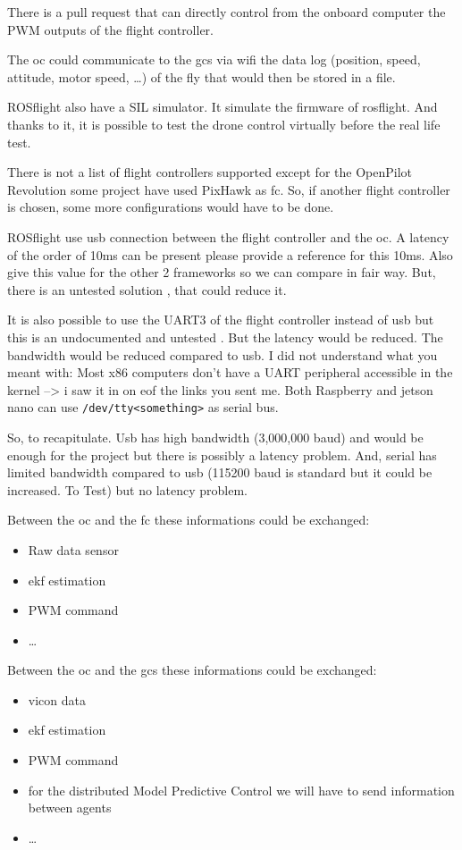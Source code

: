 There is a pull request \cite{github_rosflight_98} that can directly control from the onboard computer the PWM outputs of the flight controller.

The \gls{oc} could communicate to the \gls{gcs} via wifi the data log (position, speed, attitude, motor speed, …) of the fly that would then be stored in a file.

ROSflight also have a SIL simulator. It simulate the firmware of rosflight. And thanks to it, it is possible to test the drone control virtually before the real life test.

There is not a list of flight controllers supported except for the OpenPilot Revolution some project have used PixHawk as \gls{fc}.
So, if another flight controller is chosen, some more configurations would have to be done.

ROSflight use usb connection between the flight controller and the \gls{oc}. A latency of the order of 10ms can be present {\color{red} please provide a reference for this 10ms. Also give this value for the other 2 frameworks so we can compare in fair way}. But, there is an untested solution \cite{github_rosflight_98}, that could reduce it.

It is also possible to use the UART3 of the flight controller instead of usb but this is an undocumented and untested \cite{github_rosflight_98}.
But the latency would be reduced. The bandwidth would be reduced compared to usb.
{\color{red} I did not understand what you meant with: Most x86 computers don't have a UART peripheral accessible in the kernel --> i saw it in on eof the links you sent me.}
Both Raspberry and jetson nano can use \texttt{/dev/tty<something>} as serial bus.

So, to recapitulate. Usb has high bandwidth (3,000,000 baud) and would be enough for the project \cite{github_rosflight_98} but there is possibly a latency problem.
And, serial has limited bandwidth compared to usb (115200 baud is standard but it could be increased. To Test) but no latency problem.

Between the \gls{oc} and the \gls{fc} these informations could be exchanged:
\begin{itemize}
    \item Raw data sensor
    \item \gls{ekf} estimation
    \item PWM command
    \item …
\end{itemize}

Between the \gls{oc} and the \gls{gcs} these informations could be exchanged:
\begin{itemize}
    \item vicon data
    \item \gls{ekf} estimation
    \item PWM command
    \item for the distributed Model Predictive Control we will have to send information between agents
    \item …
\end{itemize}

